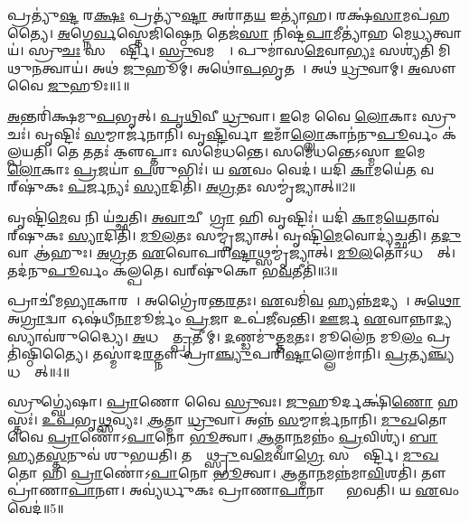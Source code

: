 \clearpage
{}
\setcounter{anuvakam}{0}

𑌪𑍍𑌰𑌤𑍍𑌯𑍁॑\ul{𑌷𑍍𑌟}\ul{} 𑌰\ul{𑌕𑍍𑌷𑌃} 𑌪𑍍𑌰𑌤𑍍𑌯𑍁॑\ul{𑌷𑍍𑌟𑌾} 𑌅𑌰𑌾॑𑌤\ul{𑌯} 𑌇𑌤𑍍𑌯𑌾॑𑌹।
𑌰𑌕𑍍𑌷॑\ul{𑌸𑌾}𑌮𑌪॑𑌹𑌤𑍍𑌯𑍈।
\ul{𑌅}𑌗𑍍𑌨𑍇\ul{𑌰𑍍𑌵}𑌸𑍍𑌤𑍇𑌜𑌿॑𑌷𑍍𑌠𑍇\ul{𑌨} 𑌤𑍇𑌜॑\ul{𑌸𑌾} 𑌨𑌿𑌷𑍍𑌟॑\ul{𑌪𑌾}𑌮𑍀𑌤𑍍𑌯𑌾॑𑌹 𑌮𑍇\ul{𑌧𑍍𑌯}𑌤𑍍𑌵𑌾𑌯॑।
𑌸𑍍𑌰𑍁\ul{𑌚𑌃} 𑌸𑌮𑍍𑌮𑌾᳚𑌰𑍍𑌷𑍍𑌟𑌿।
\ul{𑌸𑍍𑌰𑍁}𑌵𑌮𑌗𑍍𑌰𑍇᳚।
𑌪𑍁𑌮𑌾॑𑌸\ul{𑌮𑍇}𑌵𑌾\ul{𑌭𑍍𑌯𑌃} 𑌸𑌶𑍍𑌯॑𑌤𑌿 𑌮𑌿𑌥𑍁\ul{𑌨}𑌤𑍍𑌵𑌾𑌯॑।
𑌅𑌥॑ \ul{𑌜𑍁}𑌹𑍂𑌮𑍍।
𑌅𑌥𑍋॑\ul{𑌪}𑌭𑍃𑌤𑌮𑍍᳚।
𑌅𑌥॑ \ul{𑌧𑍍𑌰𑍁}𑌵𑌾𑌮𑍍।
\ul{𑌅}𑌸𑍗 𑌵𑍈 \ul{𑌜𑍁}𑌹𑍂𑌃॥1॥

\ul{𑌅}𑌨𑍍𑌤𑌰𑌿॑𑌕𑍍𑌷𑌮𑍁\ul{𑌪}𑌭𑍃𑌤𑍍।
\ul{𑌪𑍃}\ul{𑌥𑌿}𑌵𑍀 \ul{𑌧𑍍𑌰𑍁}𑌵𑌾।
\ul{𑌇}𑌮𑍇 𑌵𑍈 \ul{𑌲𑍋}𑌕𑌾𑌃 𑌸𑍍𑌰𑍁𑌚𑌃॑।
𑌵𑍃𑌷𑍍𑌟𑌿𑌃॑ \ul{𑌸}𑌮𑍍𑌮𑌾𑌰𑍍𑌜॑𑌨𑌾𑌨𑌿।
𑌵𑍃\ul{𑌷𑍍𑌟𑌿}𑌰𑍍𑌵𑌾 \ul{𑌇}𑌮𑌾𑌁\ul{𑌲𑍍𑌲𑍋}𑌕𑌾𑌨॑𑌨𑍁\ul{𑌪𑍂}𑌰𑍍𑌵𑌂 𑌕॑𑌲𑍍𑌪𑌯𑌤𑌿।
𑌤𑍇 𑌤𑌤𑌃॑ 𑌕𑍢॒𑌪𑍍𑌤𑌾𑌃 𑌸𑌮𑍇॑𑌧𑌨𑍍𑌤𑍇।
𑌸𑌮𑍇॑𑌧𑌨𑍍𑌤𑍇\-𑌽𑌸𑍍𑌮𑌾 \ul{𑌇}𑌮𑍇 \ul{𑌲𑍋}𑌕𑌾𑌃 \ul{𑌪𑍍𑌰}𑌜𑌯𑌾॑ \ul{𑌪}𑌶𑍁𑌭𑌿𑌃॑।
𑌯 \ul{𑌏}𑌵𑌂 𑌵𑍇𑌦॑।
𑌯𑌦𑌿॑ \ul{𑌕𑌾}𑌮𑌯𑍇॑\ul{𑌤} 𑌵𑌰𑍍‌\mbox{}𑌷𑍁॑𑌕𑌃 \ul{𑌪}𑌰𑍍𑌜𑌨𑍍𑌯𑌃॑ \ul{𑌸𑍍𑌯𑌾}𑌦𑌿𑌤𑌿॑।
\ul{𑌅}\ul{𑌗𑍍𑌰}𑌤𑌃 𑌸𑌮𑍍𑌮𑍃॑𑌜𑍍𑌯𑌾𑌤𑍍॥2॥

𑌵𑍃𑌷𑍍𑌟𑌿॑\ul{𑌮𑍇}𑌵 𑌨𑌿 𑌯॑𑌚𑍍𑌛𑌤𑌿।
\ul{𑌅}\ul{𑌵𑌾}𑌚𑍀𑌨𑌾᳚\ul{𑌗𑍍𑌰𑌾} 𑌹𑌿 𑌵𑍃𑌷𑍍𑌟𑌿𑌃॑।
𑌯𑌦𑌿॑ \ul{𑌕𑌾}𑌮\ul{𑌯𑍇}𑌤𑌾𑌵॑𑌰𑍍‌\mbox{}𑌷𑍁𑌕𑌃 \ul{𑌸𑍍𑌯𑌾}𑌦𑌿𑌤𑌿॑।
\ul{𑌮𑍂}\ul{𑌲}𑌤𑌃 𑌸𑌮𑍍𑌮𑍃॑𑌜𑍍𑌯𑌾𑌤𑍍।
𑌵𑍃𑌷𑍍𑌟𑌿॑\ul{𑌮𑍇}𑌵𑍋𑌦𑍍𑌯॑𑌚𑍍𑌛𑌤𑌿।
𑌤\ul{𑌦𑍁} 𑌵𑌾 𑌆॑𑌹𑍁𑌃।
\ul{𑌅}\ul{𑌗𑍍𑌰}𑌤 \ul{𑌏}𑌵𑍋𑌪𑌰𑌿॑\ul{𑌷𑍍𑌟𑌾}𑌥𑍍𑌸𑌮𑍍𑌮𑍃॑\-𑌜𑍍𑌯𑌾𑌤𑍍।
\ul{𑌮𑍂}\ul{𑌲}𑌤𑍋॑\-𑌽𑌧𑌸𑍍𑌤𑌾᳚𑌤𑍍।
𑌤𑌦॑𑌨𑍁\ul{𑌪𑍂}𑌰𑍍𑌵𑌂 𑌕॑𑌲𑍍𑌪𑌤𑍇।
𑌵𑌰𑍍‌\mbox{}𑌷𑍁॑𑌕𑍋 𑌭\ul{𑌵}𑌤𑍀𑌤𑌿॑॥3॥

𑌪𑍍𑌰𑌾𑌚𑍀॑𑌮\ul{𑌭𑍍𑌯𑌾}𑌕𑌾𑌰𑌮𑍍᳚।
𑌅𑌗𑍍𑌰𑍈॑𑌰𑌨𑍍𑌤\ul{𑌰}𑌤𑌃।
\ul{𑌏}𑌵𑌮𑌿॑\ul{𑌵} 𑌹𑍍𑌯𑌨𑍍𑌨॑\ul{𑌮}𑌦𑍍𑌯𑌤𑍇᳚।
𑌅\ul{𑌥𑍋} 𑌅\ul{𑌗𑍍𑌰𑌾}𑌦𑍍𑌵𑌾 𑌓𑌷॑𑌧𑍀\ul{𑌨𑌾}𑌮𑍂𑌰𑍍𑌜𑌂॑ \ul{𑌪𑍍𑌰}𑌜𑌾 𑌉𑌪॑𑌜𑍀𑌵𑌨𑍍𑌤𑌿।
\ul{𑌊}𑌰𑍍𑌜 \ul{𑌏}𑌵𑌾𑌨𑍍𑌨𑌾\ul{𑌦𑍍𑌯}𑌸𑍍𑌯𑌾𑌵॑𑌰𑍁𑌦𑍍𑌧𑍍𑌯𑍈।
\ul{𑌅}𑌧𑌸𑍍𑌤𑌾᳚\ul{𑌤𑍍𑌪𑍍𑌰}𑌤𑍀𑌚𑍀᳚𑌮𑍍।
\ul{𑌦}𑌣𑍍𑌡𑌮𑍁॑𑌤𑍍𑌤\ul{𑌮}𑌤𑌃।
𑌮𑍂𑌲𑍇॑\ul{𑌨} 𑌮𑍂\ul{𑌲𑌂} 𑌪𑍍𑌰𑌤𑌿॑\-𑌷𑍍𑌠𑌿𑌤𑍍𑌯𑍈।
𑌤𑌸𑍍𑌮𑌾॑𑌦\ul{𑌰}𑌤𑍍𑌨𑍗 𑌪𑍍𑌰𑌾\ul{𑌞𑍍𑌚𑍍𑌯𑍁}𑌪𑌰𑌿॑\ul{𑌷𑍍𑌟𑌾}𑌲𑍍𑌲𑍋𑌮𑌾॑𑌨𑌿।
\ul{𑌪𑍍𑌰}𑌤𑍍𑌯\ul{𑌞𑍍𑌚𑍍𑌯}𑌧𑌸𑍍𑌤𑌾᳚𑌤𑍍॥4॥

𑌸𑍍𑌰𑍁𑌗𑍍𑌘𑍍𑌯𑍇॑𑌷𑌾।
\ul{𑌪𑍍𑌰𑌾}𑌣𑍋 𑌵𑍈 \ul{𑌸𑍍𑌰𑍁}𑌵𑌃।
\ul{𑌜𑍁}𑌹𑍂𑌰𑍍𑌦𑌕𑍍𑌷𑌿॑\ul{𑌣𑍋} 𑌹𑌸𑍍𑌤𑌃॑।
\ul{𑌉}\ul{𑌪}𑌭𑍃\ul{𑌥𑍍𑌸}𑌵𑍍𑌯𑌃।
\ul{𑌆}𑌤𑍍𑌮𑌾 \ul{𑌧𑍍𑌰𑍁}𑌵𑌾।
𑌅𑌨𑍍𑌨॑ \ul{𑌸}𑌮𑍍𑌮𑌾𑌰𑍍𑌜॑𑌨𑌾𑌨𑌿।
\ul{𑌮𑍁}\ul{𑌖}𑌤𑍋 𑌵𑍈 \ul{𑌪𑍍𑌰𑌾}𑌣𑍋॑\-𑌽\ul{𑌪𑌾}𑌨𑍋 \ul{𑌭𑍂}𑌤𑍍𑌵𑌾।
\ul{𑌆}𑌤𑍍𑌮𑌾\ul{𑌨}𑌮𑌨𑍍𑌨𑌂॑ \ul{𑌪𑍍𑌰}𑌵𑌿𑌶𑍍𑌯॑।
\ul{𑌬𑌾}\ul{𑌹𑍍𑌯}𑌤\ul{𑌸𑍍𑌤}𑌨𑍁𑌵॑ 𑌶𑍁𑌭𑌯𑌤𑌿।
𑌤𑌸𑍍𑌮𑌾᳚\ul{𑌥𑍍𑌸𑍍𑌰𑍁}𑌵\ul{𑌮𑍇}𑌵𑌾\ul{𑌗𑍍𑌰𑍇} 𑌸𑌮𑍍𑌮𑌾᳚𑌰𑍍𑌷𑍍𑌟𑌿।
\ul{𑌮𑍁}\ul{𑌖}𑌤𑍋 𑌹𑌿 \ul{𑌪𑍍𑌰𑌾}𑌣𑍋॑\-𑌽\ul{𑌪𑌾}𑌨𑍋 \ul{𑌭𑍂}𑌤𑍍𑌵𑌾।
\ul{𑌆}𑌤𑍍𑌮𑌾\ul{𑌨}𑌮𑌨𑍍𑌨॑𑌮𑌾\ul{𑌵𑌿}𑌶𑌤𑌿॑।
𑌤𑍗 𑌪𑍍𑌰𑌾॑𑌣𑌾\ul{𑌪𑌾}𑌨𑍗।
𑌅𑌵𑍍𑌯॑𑌰𑍍𑌧𑍁𑌕𑌃 𑌪𑍍𑌰𑌾𑌣𑌾\ul{𑌪𑌾}𑌨𑌾𑌭𑍍𑌯𑌾𑌂᳚ 𑌭𑌵𑌤𑌿।
𑌯 \ul{𑌏}𑌵𑌂 𑌵𑍇𑌦॑॥5॥\anuvakamend[\ul{𑌜𑍁}𑌹𑍂𑌰𑍍𑌮𑍃॑𑌜𑍍𑌯𑌾𑌦𑍍𑌭\ul{𑌵}𑌤𑍀𑌤𑌿॑ \ul{𑌪𑍍𑌰}𑌤𑍍𑌯\ul{𑌞𑍍𑌚𑍍𑌯}𑌧𑌸𑍍𑌤𑌾᳚𑌨𑍍𑌮𑌾\ul{𑌰𑍍𑌷𑍍𑌟𑌿} 𑌪𑌞𑍍𑌚॑ 𑌚]

